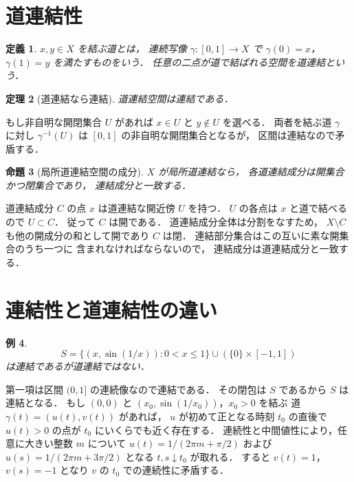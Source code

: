\documentclass[a5paper,10pt,onecolumn]{jsarticle}
\makeatletter
\theoremstyle{mathnotetheorem}
\newtheorem{theorem}{定理}[section]
\newtheorem{definition}[theorem]{定義}
\newtheorem{proposition}[theorem]{命題}
\newtheorem{example}[theorem]{例}
\renewcommand{\proofname}{証明}
\renewenvironment{proof}[1][\proofname]{%
  \par\pushQED{\qed}\normalfont\topsep4\p@\@plus2\p@\relax
  \trivlist\item[\hskip\labelsep\bfseries #1]\ignorespaces
}{\popQED\endtrivlist\@endpefalse}
\makeatother
\begin{document}
\section{道連結性}
\begin{definition}
$x,y\in X$ を結ぶ道とは，
連続写像 $\gamma:[0,1]\to X$ で
$\gamma(0)=x$，$\gamma(1)=y$ を満たすものをいう．
任意の二点が道で結ばれる空間を道連結という．
\end{definition}
\begin{theorem}[道連結なら連結]
道連結空間は連結である．
\end{theorem}
\begin{proof}
もし非自明な開閉集合 $U$ があれば
$x\in U$ と $y\notin U$ を選べる．
両者を結ぶ道 $\gamma$ に対し
$\gamma^{-1}(U)$ は $[0,1]$ の非自明な開閉集合となるが，
区間は連結なので矛盾する．
\end{proof}
\begin{proposition}[局所道連結空間の成分]\label{prop:localpath}
$X$ が局所道連結なら，
各道連結成分は開集合かつ閉集合であり，
連結成分と一致する．
\end{proposition}
\begin{proof}
道連結成分 $C$ の点 $x$ は道連結な開近傍 $U$ を持つ．
$U$ の各点は $x$ と道で結べるので $U\subset C$．
従って $C$ は開である．
道連結成分全体は分割をなすため，
$X\setminus C$ も他の開成分の和として開であり $C$ は閉．
連結部分集合はこの互いに素な開集合のうち一つに
含まれなければならないので，
連結成分は道連結成分と一致する．
\end{proof}
\section{連結性と道連結性の違い}
\begin{example}
\[
 S=\{(x,\sin(1/x)):0<x\le1\}
 \cup(\{0\}\times[-1,1])
\]
は連結であるが道連結ではない．
\end{example}
\begin{proof}
第一項は区間 $(0,1]$ の連続像なので連結である．
その閉包は $S$ であるから $S$ は連結となる．
もし $(0,0)$ と $(x_0,\sin(1/x_0))$，$x_0>0$ を結ぶ
道 $\gamma(t)=(u(t),v(t))$ があれば，
$u$ が初めて正となる時刻 $t_0$ の直後で
$u(t)>0$ の点が $t_0$ にいくらでも近く存在する．
連続性と中間値性により，任意に大きい整数 $m$ について
$u(t)=1/(2\pi m+\pi/2)$ および
$u(s)=1/(2\pi m+3\pi/2)$ となる
$t,s\downarrow t_0$ が取れる．
すると $v(t)=1$，$v(s)=-1$ となり
$v$ の $t_0$ での連続性に矛盾する．
\end{proof}
\end{document}

